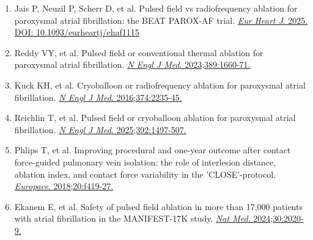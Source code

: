 \documentclass[12pt,a4paper]{article}
\begin{document}
\begin{enumerate}
    \item Jais P, Neuzil P, Scherr D, et al. Pulsed field vs radiofrequency ablation for paroxysmal atrial fibrillation: the BEAT PAROX-AF trial. \href{https://doi.org/10.1093/eurheartj/ehaf1115}{\textit{Eur Heart J}. 2025. DOI: 10.1093/eurheartj/ehaf1115}

    \item Reddy VY, et al. Pulsed field or conventional thermal ablation for paroxysmal atrial fibrillation. \href{https://doi.org/10.1056/NEJMoa2307291}{\textit{N Engl J Med}. 2023;389:1660-71.}

    \item Kuck KH, et al. Cryoballoon or radiofrequency ablation for paroxysmal atrial fibrillation. \href{https://doi.org/10.1056/NEJMoa1602014}{\textit{N Engl J Med}. 2016;374:2235-45.}

    \item Reichlin T, et al. Pulsed field or cryoballoon ablation for paroxysmal atrial fibrillation. \href{https://doi.org/10.1056/NEJMoa2502280}{\textit{N Engl J Med}. 2025;392:1497-507.}

    \item Phlips T, et al. Improving procedural and one-year outcome after contact force-guided pulmonary vein isolation: the role of interlesion distance, ablation index, and contact force variability in the 'CLOSE'-protocol. \href{https://doi.org/10.1093/europace/eux376}{\textit{Europace}. 2018;20:f419-27.}

    \item Ekanem E, et al. Safety of pulsed field ablation in more than 17,000 patients with atrial fibrillation in the MANIFEST-17K study. \href{https://doi.org/10.1038/s41591-024-03114-3}{\textit{Nat Med}. 2024;30:2020-9.}
\end{enumerate}
\end{document}
